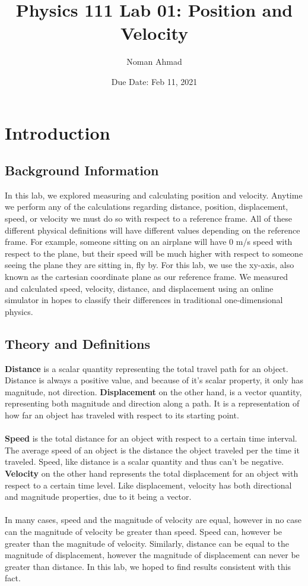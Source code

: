 \documentclass{article}
\title{Physics 111 Lab 01: Position and Velocity}
\author{Noman Ahmad}
\date{Due Date: Feb 11, 2021}
\begin{document}
\maketitle

\section{Introduction}

\subsection{Background Information}
In this lab, we explored measuring and calculating position and velocity. Anytime we perform any of the calculations regarding distance, position, displacement, speed, or velocity we must do so with respect to a reference frame. All of these different physical definitions will have different values depending on the reference frame. For example, someone sitting on an airplane will have 0 m/s speed with respect to the plane, but their speed will be much higher with respect to someone seeing the plane they are sitting in, fly by. For this lab, we use the xy-axis, also known as the cartesian coordinate plane as our reference frame. We measured and calculated speed, velocity, distance, and displacement using an online simulator in hopes to classify their differences in traditional one-dimensional physics. 

\subsection{Theory and Definitions}
\textbf{Distance} is a scalar quantity representing the total travel path for an object. Distance is always a positive value, and because of it's scalar property, it only has magnitude, not direction. \textbf{Displacement} on the other hand, is a vector quantity, representing both magnitude and direction along a path. It is a representation of how far an object has traveled with respect to its starting point. \\ \\ 
\textbf{Speed} is the total distance for an object with respect to a certain time interval. The average speed of an object is the distance the object traveled per the time it traveled. Speed, like distance is a scalar quantity and thus can't be negative. \textbf{Velocity} on the other hand represents the total displacement for an object with respect to a certain time level. Like displacement, velocity has both directional and magnitude properties, due to it being a vector. \\ \\ 
In many cases, speed and the magnitude of velocity are equal, however in no case can the magnitude of velocity be greater than speed. Speed can, however be greater than the magnitude of velocity. Similarly, distance can be equal to the magnitude of displacement, however the magnitude of displacement can never be greater than distance. In this lab, we hoped to find results consistent with this fact. 
\end{document}
